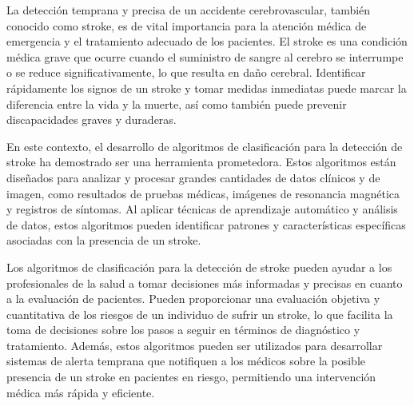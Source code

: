 La detección temprana y precisa de un accidente cerebrovascular, también conocido como stroke, es de vital importancia para la atención médica de emergencia y el tratamiento adecuado de los pacientes. El stroke es una condición médica grave que ocurre cuando el suministro de sangre al cerebro se interrumpe o se reduce significativamente, lo que resulta en daño cerebral. Identificar rápidamente los signos de un stroke y tomar medidas inmediatas puede marcar la diferencia entre la vida y la muerte, así como también puede prevenir discapacidades graves y duraderas.

En este contexto, el desarrollo de algoritmos de clasificación para la detección de stroke ha demostrado ser una herramienta prometedora. Estos algoritmos están diseñados para analizar y procesar grandes cantidades de datos clínicos y de imagen, como resultados de pruebas médicas, imágenes de resonancia magnética y registros de síntomas. Al aplicar técnicas de aprendizaje automático y análisis de datos, estos algoritmos pueden identificar patrones y características específicas asociadas con la presencia de un stroke.

Los algoritmos de clasificación para la detección de stroke pueden ayudar a los profesionales de la salud a tomar decisiones más informadas y precisas en cuanto a la evaluación de pacientes. Pueden proporcionar una evaluación objetiva y cuantitativa de los riesgos de un individuo de sufrir un stroke, lo que facilita la toma de decisiones sobre los pasos a seguir en términos de diagnóstico y tratamiento. Además, estos algoritmos pueden ser utilizados para desarrollar sistemas de alerta temprana que notifiquen a los médicos sobre la posible presencia de un stroke en pacientes en riesgo, permitiendo una intervención médica más rápida y eficiente.
